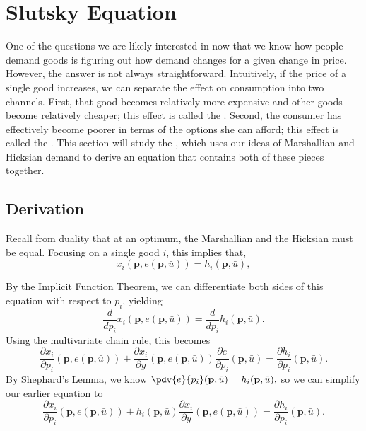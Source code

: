 \section{Slutsky Equation} 
One of the questions we are likely interested in now that we know how people demand goods is figuring out how demand changes for a given change in price. However, the answer is not always straightforward. Intuitively, if the price of a single good increases, we can separate the effect on consumption into two channels. First, that good becomes relatively more expensive and other goods become relatively cheaper; this effect is called the . Second, the consumer has effectively become poorer in terms of the options she can afford; this effect is called the . This section will study the , which uses our ideas of Marshallian and Hicksian demand to derive an equation that contains both of these pieces together.

\subsection*{Derivation}
Recall from duality that at an optimum, the Marshallian and the Hicksian must be equal. Focusing on a single good $i$, this implies that, 
$$x_{i}(\mathbf{p}, e(\mathbf{p}, \bar{u}))=h_{i}(\mathbf{p}, \bar{u}),$$

By the Implicit Function Theorem, we can differentiate both sides of this equation with respect to $p_i$, yielding 
$$\frac{d}{d p_{i}} x_{i}(\mathbf{p}, e(\mathbf{p}, \bar{u}))=\frac{d}{d p_{i}} h_{i}(\mathbf{p}, \bar{u}).$$
Using the multivariate chain rule, this becomes 
$$\frac{\partial x_{i}}{\partial p_{i}}(\mathbf{p}, e(\mathbf{p}, \bar{u}))+\frac{\partial x_{i}}{\partial y}(\mathbf{p}, e(\mathbf{p}, \bar{u})) \frac{\partial e}{\partial p_{i}}(\mathbf{p}, \bar{u})=\frac{\partial h_{i}}{\partial p_{i}}(\mathbf{p}, \bar{u}).$$
By Shephard's Lemma, we know $\pdv{e}{p_i}(\mathbf{p}, \bar{u})=h_{i}(\mathbf{p}, \bar{u}),$ so we can simplify our earlier equation to 
$$\frac{\partial x_{i}}{\partial p_{i}}(\mathbf{p}, e(\mathbf{p}, \bar{u}))+h_{i}(\mathbf{p}, \bar{u}) \frac{\partial x_{i}}{\partial y}(\mathbf{p}, e(\mathbf{p}, \bar{u}))=\frac{\partial h_{i}}{\partial p_{i}}(\mathbf{p}, \bar{u}).$$

